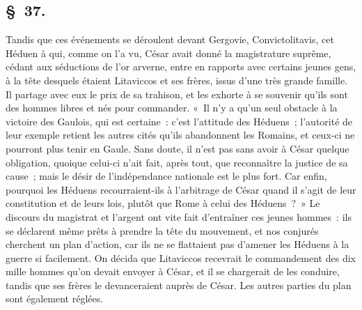 \documentclass[french,twoside]{book} %
\begin{document}
\subsection[{§ 37.}]{ \textsc{§ 37.} }
\noindent Tandis que ces événements se déroulent devant Gergovie, Convictolitavis, cet Héduen à qui, comme on l’a vu, César avait donné la magistrature suprême, cédant aux séductions de l’or arverne, entre en rapports avec certains jeunes gens, à la tête desquels étaient Litaviccos et ses frères, issus d’une très grande famille. Il partage avec eux le prix de sa trahison, et les exhorte à se souvenir qu’ils sont des hommes libres et nés pour commander. « Il n’y a qu’un seul obstacle à la victoire des Gaulois, qui est certaine : c’est l’attitude des Héduens ; l’autorité de leur exemple retient les autres cités qu’ils abandonnent les Romains, et ceux-ci ne pourront plus tenir en Gaule. Sans doute, il n’est pas sans avoir à César quelque obligation, quoique celui-ci n’ait fait, après tout, que reconnaître la justice de sa cause ; mais le désir de l’indépendance nationale est le plus fort. Car enfin, pourquoi les Héduens recourraient-ils à l’arbitrage de César quand il s’agit de leur constitution et de leurs lois, plutôt que Rome à celui des Héduens ? » Le discours du magistrat et l’argent ont vite fait d’entraîner ces jeunes hommes : ils se déclarent même prêts à prendre la tête du mouvement, et nos conjurés cherchent un plan d’action, car ils ne se flattaient pas d’amener les Héduens à la guerre si facilement. On décida que Litaviccos recevrait le commandement des dix mille hommes qu’on devait envoyer à César, et il se chargerait de les conduire, tandis que ses frères le devanceraient auprès de César. Les autres parties du plan sont également réglées.
\end{document}
